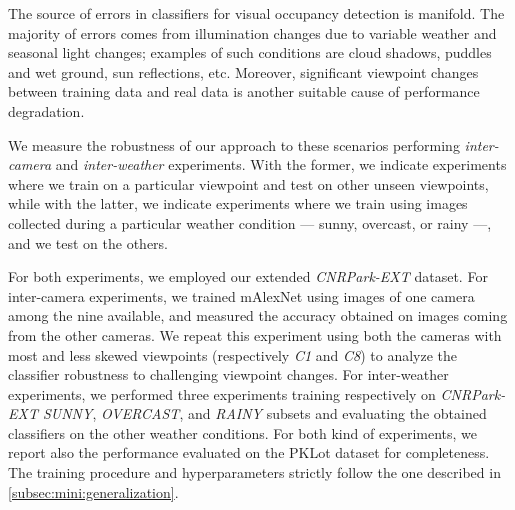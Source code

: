 The source of errors in classifiers for visual occupancy detection is manifold.
The majority of errors comes from illumination changes due to variable weather and seasonal light changes;
examples of such conditions are cloud shadows, puddles and wet ground, sun reflections, etc.
Moreover, significant viewpoint changes between training data and real data is another suitable cause of performance degradation.

We measure the robustness of our approach to these scenarios performing \emph{inter-camera} and \emph{inter-weather} experiments.
With the former, we indicate experiments where we train on a particular viewpoint and test on other unseen viewpoints, while with the latter, we indicate experiments where we train using images collected during a particular weather condition --- sunny, overcast, or rainy ---, and we test on the others.

For both experiments, we employed our extended \emph{CNRPark-EXT} dataset.
For inter-camera experiments, we trained mAlexNet using images of one camera among the nine available, and measured the accuracy obtained on images coming from the other cameras.
We repeat this experiment using both the cameras with most and less skewed viewpoints (respectively \emph{C1} and \emph{C8}) to analyze the classifier robustness to challenging viewpoint changes.
For inter-weather experiments, we performed three experiments training respectively on \emph{CNRPark-EXT SUNNY}, \emph{OVERCAST}, and \emph{RAINY} subsets and evaluating the obtained classifiers on the other weather conditions.
For both kind of experiments, we report also the performance evaluated on the PKLot dataset for completeness.
The training procedure and hyperparameters strictly follow the one described in \ref{subsec:mini:generalization}.

